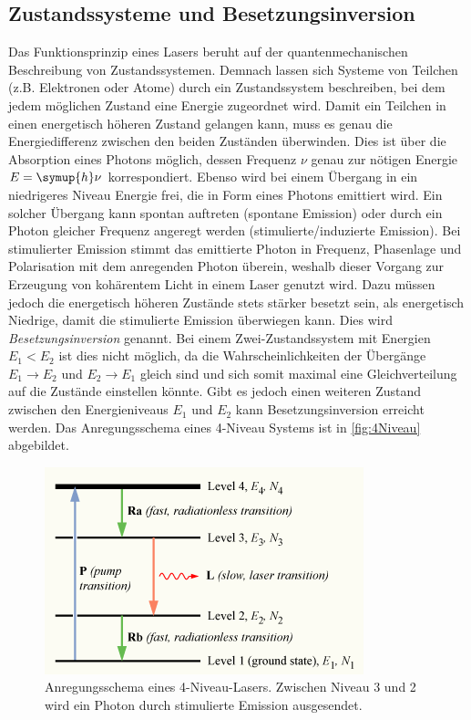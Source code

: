 \subsection{Zustandssysteme und Besetzungsinversion}
\label{subsec:Theorie_Zustandssysteme}
Das Funktionsprinzip eines Lasers beruht auf der quantenmechanischen Beschreibung von Zustandssystemen. Demnach lassen sich Systeme von Teilchen (z.B. Elektronen oder Atome)
durch ein Zustandssystem beschreiben, bei dem jedem möglichen Zustand eine Energie zugeordnet wird. Damit ein Teilchen in einen energetisch höheren Zustand gelangen kann,
muss es genau die Energiedifferenz zwischen den beiden Zuständen überwinden. Dies ist über die Absorption eines Photons möglich, dessen Frequenz $\nu$ genau zur nötigen 
Energie $E = \symup{h}\nu$ korrespondiert. Ebenso wird bei einem Übergang in ein niedrigeres Niveau Energie frei, die in Form eines Photons emittiert wird. Ein solcher 
Übergang kann spontan auftreten (spontane Emission) oder durch ein Photon gleicher Frequenz angeregt werden (stimulierte/induzierte Emission). Bei stimulierter Emission
stimmt das emittierte Photon in Frequenz, Phasenlage und Polarisation mit dem anregenden Photon überein, weshalb dieser Vorgang zur Erzeugung von kohärentem Licht in einem 
Laser genutzt wird. Dazu müssen jedoch die energetisch höheren Zustände stets stärker besetzt sein, als energetisch Niedrige, damit die stimulierte Emission überwiegen kann. 
Dies wird \textit{Besetzungsinversion} genannt. Bei einem Zwei-Zustandssystem mit Energien $E_1 < E_2$ ist dies nicht möglich, da die Wahrscheinlichkeiten der Übergänge
$E_1 \to E_2$ und $E_2 \to E_1$ gleich sind und sich somit maximal eine Gleichverteilung auf die Zustände einstellen könnte. Gibt es jedoch einen weiteren Zustand zwischen
den Energieniveaus $E_1$ und $E_2$ kann Besetzungsinversion erreicht werden. Das Anregungsschema eines 4-Niveau Systems ist in \autoref{fig:4Niveau} abgebildet.
\begin{figure}
    \centering
    \includegraphics[scale=0.58]{content/pics/Population-inversion-4level.png}
    \caption{Anregungsschema eines 4-Niveau-Lasers. Zwischen Niveau 3 und 2 wird ein Photon durch stimulierte Emission ausgesendet. \cite{wikipedia_population_inversion}}
    \label{fig:4Niveau}
\end{figure}
